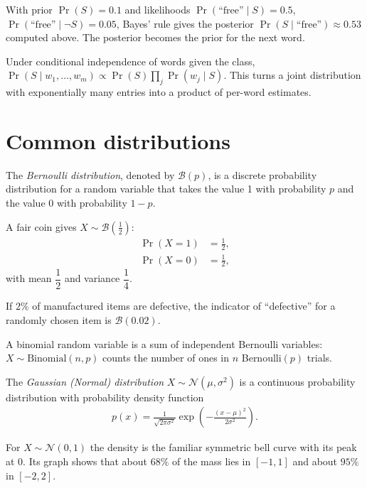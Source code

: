 \documentclass[a4paper, 12pt]{book}
\begin{document}
\begin{example}
    With prior $\Pr(S)=0.1$ and likelihoods $\Pr(\text{``free''}\mid S)=0.5$, $\Pr(\text{``free''}\mid \neg S)=0.05$, Bayes' rule gives the posterior $\Pr(S\mid\text{``free''})\approx0.53$ computed above. The posterior becomes the prior for the next word.
\end{example}

\begin{example}
    Under conditional independence of words given the class, $\Pr(S\mid w_1,\ldots,w_m)\propto\Pr(S)\prod_j\Pr(w_j\mid S)$. This turns a joint distribution with exponentially many entries into a product of per-word estimates.
\end{example}

\section{Common distributions}

\begin{definition}
    The \emph{Bernoulli distribution}, denoted by $\mathscr{B}(p)$, is a discrete probability distribution for a random variable that takes the value 1 with probability $p$ and the value 0 with probability $1-p$.
\end{definition}
\begin{example}
    A fair coin gives $X\sim\mathscr{B}\left( \frac{1}{2} \right)$:
    \begin{align}
        \Pr(X=1) &= \frac{1}{2}, \\
        \Pr(X=0) &=\frac{1}{2},
    \end{align}
    with mean $\dfrac{1}{2}$ and variance $\dfrac{1}{4}$.
\end{example}

\begin{example}
    If $2\%$ of manufactured items are defective, the indicator of ``defective'' for a randomly chosen item is $\mathscr{B}(0.02)$.
\end{example}

\begin{example}
    A binomial random variable is a sum of independent Bernoulli variables: $X\sim\mathrm{Binomial}(n,p)$ counts the number of ones in $n$ Bernoulli$(p)$ trials.
\end{example}

\begin{definition}
  The \emph{Gaussian (Normal) distribution} $X \sim \mathscr{N}(\mu, \sigma^2)$ is a continuous probability distribution with probability density function
  \begin{align}
    p(x) = \frac{1}{\sqrt{2\pi\sigma^2}}
    \exp\!\left(-\frac{(x-\mu)^2}{2\sigma^2}\right).
\end{align}
\end{definition}
\begin{example}
    For $X\sim\mathscr{N}(0,1)$ the density is the familiar symmetric bell curve with its peak at $0$. Its graph shows that about $68\%$ of the mass lies in $[-1,1]$ and about $95\%$ in $[-2,2]$.
\end{example}
\end{document}
